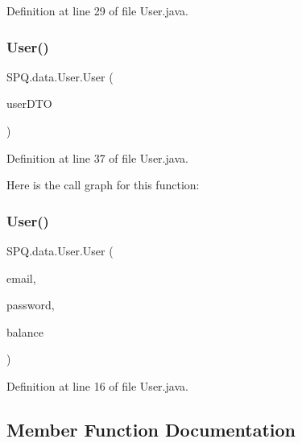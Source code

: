 Definition at line 29 of file User.\+java.

\mbox{\label{class_s_p_q_1_1data_1_1_user_af8e381901a649027950a0b0f8b22a235}} 
\subsubsection{\texorpdfstring{User()}{User()}\hspace{0.1cm}{\footnotesize\ttfamily [4/5]}}
{\footnotesize\ttfamily S\+P\+Q.\+data.\+User.\+User (\begin{DoxyParamCaption}\item[{\mbox{\hyperlink{class_s_p_q_1_1dto_1_1_user_d_t_o}{User\+D\+TO}}}]{user\+D\+TO }\end{DoxyParamCaption})}



Definition at line 37 of file User.\+java.

Here is the call graph for this function\+:
\mbox{\label{class_s_p_q_1_1data_1_1_user_aa21a25c33b963c3af6fb07331f4cd400}} 
\subsubsection{\texorpdfstring{User()}{User()}\hspace{0.1cm}{\footnotesize\ttfamily [5/5]}}
{\footnotesize\ttfamily S\+P\+Q.\+data.\+User.\+User (\begin{DoxyParamCaption}\item[{String}]{email,  }\item[{String}]{password,  }\item[{double}]{balance }\end{DoxyParamCaption})}



Definition at line 16 of file User.\+java.



\subsection{Member Function Documentation}
\mbox{\label{class_s_p_q_1_1data_1_1_user_a47d0065ad917d39d23acd62835575179}} 
